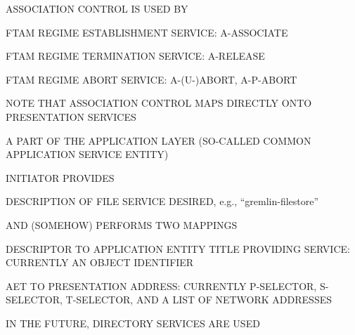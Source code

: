 \begin{bwslide}

\begin{nrtc}
\item	ASSOCIATION CONTROL IS USED BY
    \begin{nrtc}
    \item	FTAM REGIME ESTABLISHMENT SERVICE: A-ASSOCIATE

    \item	FTAM REGIME TERMINATION SERVICE: A-RELEASE

    \item	FTAM REGIME ABORT SERVICE: A-(U-)ABORT, A-P-ABORT
    \end{nrtc}

\item	NOTE THAT ASSOCIATION CONTROL MAPS DIRECTLY ONTO PRESENTATION
	SERVICES
    \begin{nrtc}
    \item	A PART OF THE APPLICATION LAYER
		(SO-CALLED COMMON APPLICATION SERVICE ENTITY)
    \end{nrtc}
\end{nrtc}
\end{bwslide}


\begin{bwslide}

\begin{nrtc}
\item	INITIATOR PROVIDES
    \begin{nrtc}
    \item	DESCRIPTION OF FILE SERVICE DESIRED,
		e.g., ``gremlin-filestore''
    \end{nrtc}
        
\item	AND (SOMEHOW) PERFORMS TWO MAPPINGS
    \begin{nrtc}
    \item	DESCRIPTOR TO APPLICATION ENTITY TITLE PROVIDING SERVICE:
		CURRENTLY AN OBJECT IDENTIFIER

    \item	AET TO PRESENTATION ADDRESS:
		CURRENTLY P-SELECTOR, S-SELECTOR, T-SELECTOR, AND A LIST OF
		NETWORK ADDRESSES
    \end{nrtc}

\item	IN THE FUTURE, DIRECTORY SERVICES ARE USED
\end{nrtc}
\end{bwslide}



